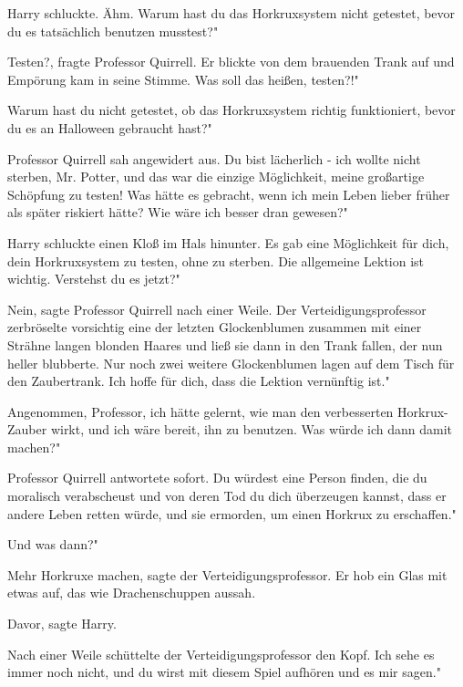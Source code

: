 Harry schluckte. \glqq Ähm. Warum hast du das Horkruxsystem nicht getestet,
bevor du es tatsächlich benutzen musstest?"

\glqq Testen?\grqq{}, fragte Professor Quirrell. Er blickte von dem brauenden
Trank auf und Empörung kam in seine Stimme. \glqq Was soll das heißen, testen?!"

\glqq Warum hast du nicht getestet, ob das Horkruxsystem richtig funktioniert,
bevor du es an Halloween gebraucht hast?"

Professor Quirrell sah angewidert aus. \glqq Du bist lächerlich - ich wollte
nicht sterben, Mr. Potter, und das war die einzige Möglichkeit, meine großartige
Schöpfung zu testen! Was hätte es gebracht, wenn ich mein Leben lieber früher
als später riskiert hätte? Wie wäre ich besser dran gewesen?"

Harry schluckte einen Kloß im Hals hinunter. \glqq Es gab eine Möglichkeit für
dich, dein Horkruxsystem zu testen, ohne zu sterben. Die allgemeine Lektion ist
wichtig. Verstehst du es jetzt?"

\glqq Nein\grqq{}, sagte Professor Quirrell nach einer Weile. Der
Verteidigungsprofessor zerbröselte vorsichtig eine der letzten Glockenblumen
zusammen mit einer Strähne langen blonden Haares und ließ sie dann in den Trank
fallen, der nun heller blubberte. Nur noch zwei weitere Glockenblumen lagen auf
dem Tisch für den Zaubertrank. \glqq Ich hoffe für dich, dass die Lektion
vernünftig ist."

\glqq Angenommen, Professor, ich hätte gelernt, wie man den verbesserten
Horkrux-Zauber wirkt, und ich wäre bereit, ihn zu benutzen. Was würde ich dann
damit machen?"

Professor Quirrell antwortete sofort. \glqq Du würdest eine Person finden, die
du moralisch verabscheust und von deren Tod du dich überzeugen kannst, dass er
andere Leben retten würde, und sie ermorden, um einen Horkrux zu erschaffen."

\glqq Und was dann?"

\glqq Mehr Horkruxe machen\grqq{}, sagte der Verteidigungsprofessor. Er hob ein
Glas mit etwas auf, das wie Drachenschuppen aussah.

\glqq Davor\grqq{}, sagte Harry.

Nach einer Weile schüttelte der Verteidigungsprofessor den Kopf. \glqq Ich sehe
es immer noch nicht, und du wirst mit diesem Spiel aufhören und es mir sagen."

